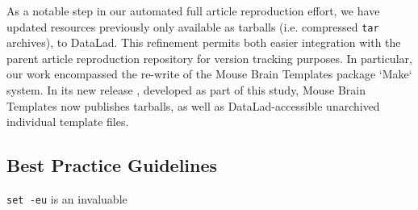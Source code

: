 As a notable step in our automated full article reproduction effort, we have updated resources previously only available as tarballs (i.e. compressed \texttt{tar} archives), to DataLad.
This refinement permits both easier integration with the parent article reproduction repository for version tracking purposes.
In particular, our work encompassed the re-write of the Mouse Brain Templates package \cite{mbt05}  `Make` system.
In its new release \cite{mbt10}, developed as part of this study, Mouse Brain Templates now publishes tarballs, as well as DataLad-accessible unarchived individual template files.

\subsection{Best Practice Guidelines}

\texttt{set -eu} is an invaluable
